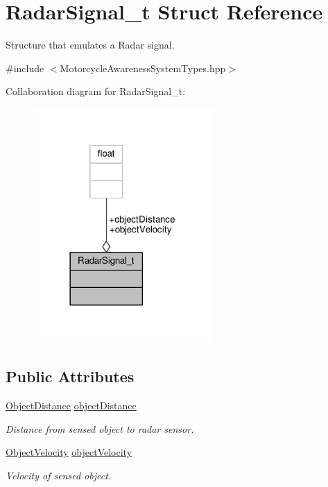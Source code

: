 \hypertarget{structRadarSignal__t}{\section{Radar\-Signal\-\_\-t Struct Reference}
\label{structRadarSignal__t}
}


Structure that emulates a Radar signal.  




{\ttfamily \#include $<$Motorcycle\-Awareness\-System\-Types.\-hpp$>$}



Collaboration diagram for Radar\-Signal\-\_\-t\-:\nopagebreak
\begin{figure}[H]
\begin{center}
\leavevmode
\includegraphics[width=194pt]{structRadarSignal__t__coll__graph}
\end{center}
\end{figure}
\subsection*{Public Attributes}
\begin{DoxyCompactItemize}
\item 
\hyperlink{MotorcycleAwarenessSystemTypes_8hpp_a6d34a01b51bff9b1cc17900d711a9b76}{Object\-Distance} \hyperlink{structRadarSignal__t_a96938fbfb77f208743a36d3f8b37cccb}{object\-Distance}
\begin{DoxyCompactList}\small\item\em Distance from sensed object to radar sensor. \end{DoxyCompactList}\item 
\hyperlink{MotorcycleAwarenessSystemTypes_8hpp_ae069b9d80ba548bc07502c05a1efaac0}{Object\-Velocity} \hyperlink{structRadarSignal__t_a0bbaf402c80288a0819dbbfaded8a44a}{object\-Velocity}
\begin{DoxyCompactList}\small\item\em Velocity of sensed object. \end{DoxyCompactList}\end{DoxyCompactItemize}


